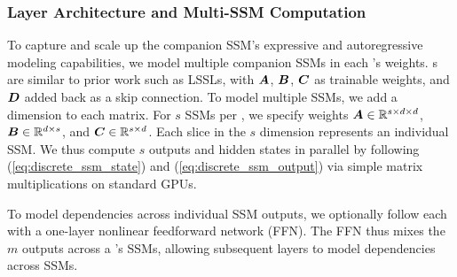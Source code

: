 
\subsubsection{Layer Architecture and Multi-SSM Computation}
\label{sec:method_spacetime_layer}

To capture and scale up the companion SSM's expressive and autoregressive modeling capabilities, we model multiple companion SSMs in each \ourmethodunit{}'s weights.
\ourmethodunit{}s are similar to prior work such as LSSLs, with $\boldsymbol{A}$, $\boldsymbol{B}$, $\boldsymbol{C}$ as trainable weights, and $\boldsymbol{D}$ added back as a skip connection. To model multiple SSMs, we add a dimension to each matrix. For $s$ SSMs per \ourmethodunit{}, we specify weights $\boldsymbol{A} \in \mathbb{R}^{s \times d \times d}$, $\boldsymbol{B} \in \mathbb{R}^{d \times s}$, and $\boldsymbol{C} \in \mathbb{R}^{s \times d}$. Each slice in the $s$ dimension represents an individual SSM. We thus compute $s$ outputs and hidden states in parallel by following (\ref{eq:discrete_ssm_state}) and (\ref{eq:discrete_ssm_output}) via simple matrix multiplications on standard GPUs.

To model dependencies across individual SSM outputs, 
we optionally follow each \ourmethodunit{} with a one-layer nonlinear feedforward network (FFN). The FFN thus mixes the $m$ outputs across a \ourmethodunit{}'s SSMs, allowing subsequent layers to model dependencies across SSMs. 



